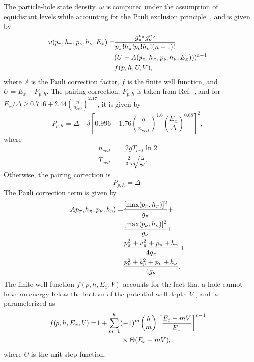 \documentclass[
10pt,
showpacs,preprintnumbers,footinbib,
amsfonts,amsmath,amssymb,
aps,
prc,twocolumn,groupedaddress,superscriptaddress,
showkeys,
nofootinbib
]{revtex4-1}
\begin{document}
The particle-hole state density. $\omega$ is computed under the assumption of equidistant levels while accounting for the Pauli exclusion principle~\cite{Betak:1976,Dobes:1983}, and is given by
\begin{align}
\omega(p_\pi,h_\pi,p_\nu,h_\nu,E_x) = & \frac{g_\pi^{n_\pi}g_\nu^{n_\nu}}{p_\pi!h_\pi!p_\nu!h_\nu!(n-1)!} \notag \\
&(U-A(p_\pi,h_\pi,p_\nu,h_\nu,E_x)))^{n-1} \notag \\
& f(p,h,U,V), 
\end{align}
where $A$ is the Pauli correction factor, $f$ is the finite well function, and $U = E_x - P_{p,h}$. The
pairing correction, $P_{p,h}$ is taken from Ref.~\cite{Fu:1984}, and for $E_x/\Delta \ge 0.716 + 2.44\left ( \frac{n}{n_{crit}}\right )^{2.17}$, it is given by
\begin{equation}
P_{p,h} = \Delta - \delta\left [ 0.996 - 1.76\left ( \frac{n}{n_{crit}}\right )^{1.6} \left (\frac{E_x}{\Delta}\right )^{0.68}\right ]^2,
\end{equation}
where
\begin{align}
n_{crit} &= 2gT_{crit}\ln 2\\
T_{crit} &= \frac{2}{3.5}\sqrt{\frac{\Delta}{\frac{1}{4} g}}.
\end{align}
Otherwise, the pairing correction is 
\begin{equation}
P_{p,h}=\Delta.
\end{equation}
The Pauli correction term is given by
\begin{align}
Ap_\pi,h_\pi,p_\nu,h_\nu) = & \frac{[\max(p_\pi,h_\pi)]^2}{g_\pi}+ \notag\\
& \frac{[\max(p_\nu,h_\nu)]^2}{g_\nu}+ \notag\\
& \frac{p_\pi^2+h_\pi^2 + p_\pi + h_\pi}{4g_\pi}+ \notag\\
& \frac{p_\nu^2+h_\nu^2 + p_\nu + h_\nu}{4g_\nu}.
\end{align}
The finite well function $f(p, h,E_x, V)$ accounts for the fact that a hole cannot have an energy below the bottom of the potential well depth $V$ , and is parameterized as
\begin{align}
f(p, h,E_x, V) =& 1 + \sum_{m=1}^h(-1)^m \begin{pmatrix} h\\m\end{pmatrix}  \left [ \frac{E_x - mV}{E_x}\right ]^{n-1} \notag\\
& \hskip 1.25 cm \times\Theta(E_x - mV),
\end{align}
where $\Theta$ is the unit step function.
\end{document}
